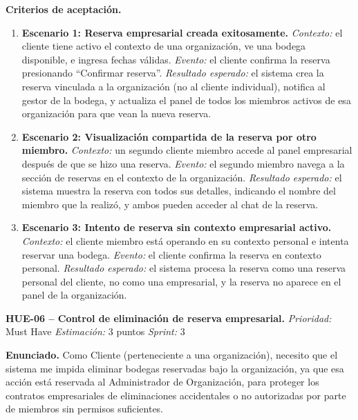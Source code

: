 \textbf{Criterios de aceptación.}
\begin{enumerate}
\item \textbf{Escenario 1: Reserva empresarial creada exitosamente.} \textit{Contexto:} el cliente tiene activo el contexto de una organización, ve una bodega disponible, e ingresa fechas válidas. \textit{Evento:} el cliente confirma la reserva presionando ``Confirmar reserva''. \textit{Resultado esperado:} el sistema crea la reserva vinculada a la organización (no al cliente individual), notifica al gestor de la bodega, y actualiza el panel de todos los miembros activos de esa organización para que vean la nueva reserva.
\item \textbf{Escenario 2: Visualización compartida de la reserva por otro miembro.} \textit{Contexto:} un segundo cliente miembro accede al panel empresarial después de que se hizo una reserva. \textit{Evento:} el segundo miembro navega a la sección de reservas en el contexto de la organización. \textit{Resultado esperado:} el sistema muestra la reserva con todos sus detalles, indicando el nombre del miembro que la realizó, y ambos pueden acceder al chat de la reserva.
\item \textbf{Escenario 3: Intento de reserva sin contexto empresarial activo.} \textit{Contexto:} el cliente miembro está operando en su contexto personal e intenta reservar una bodega. \textit{Evento:} el cliente confirma la reserva en contexto personal. \textit{Resultado esperado:} el sistema procesa la reserva como una reserva personal del cliente, no como una empresarial, y la reserva no aparece en el panel de la organización.
\end{enumerate}

\textbf{HUE-06 -- Control de eliminación de reserva empresarial.} \label{req:HUE-06}
\textit{Prioridad:} Must Have \quad \textit{Estimación:} 3 puntos \quad \textit{Sprint:} 3

\textbf{Enunciado.} Como Cliente (perteneciente a una organización), necesito que el sistema me impida eliminar bodegas reservadas bajo la organización, ya que esa acción está reservada al Administrador de Organización, para proteger los contratos empresariales de eliminaciones accidentales o no autorizadas por parte de miembros sin permisos suficientes.

